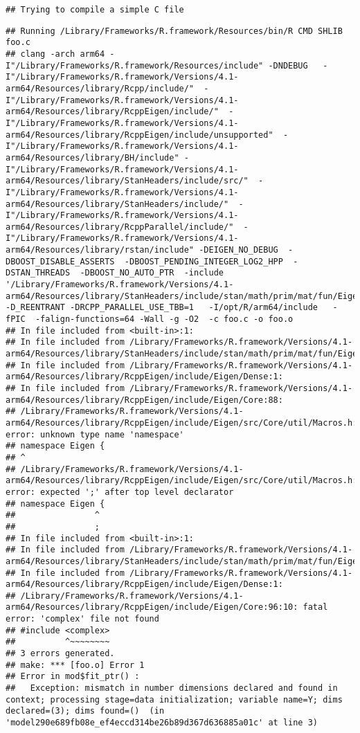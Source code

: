 \documentclass[
]{article}
\begin{document}
\begin{verbatim}
## Trying to compile a simple C file
\end{verbatim}

\begin{verbatim}
## Running /Library/Frameworks/R.framework/Resources/bin/R CMD SHLIB foo.c
## clang -arch arm64 -I"/Library/Frameworks/R.framework/Resources/include" -DNDEBUG   -I"/Library/Frameworks/R.framework/Versions/4.1-arm64/Resources/library/Rcpp/include/"  -I"/Library/Frameworks/R.framework/Versions/4.1-arm64/Resources/library/RcppEigen/include/"  -I"/Library/Frameworks/R.framework/Versions/4.1-arm64/Resources/library/RcppEigen/include/unsupported"  -I"/Library/Frameworks/R.framework/Versions/4.1-arm64/Resources/library/BH/include" -I"/Library/Frameworks/R.framework/Versions/4.1-arm64/Resources/library/StanHeaders/include/src/"  -I"/Library/Frameworks/R.framework/Versions/4.1-arm64/Resources/library/StanHeaders/include/"  -I"/Library/Frameworks/R.framework/Versions/4.1-arm64/Resources/library/RcppParallel/include/"  -I"/Library/Frameworks/R.framework/Versions/4.1-arm64/Resources/library/rstan/include" -DEIGEN_NO_DEBUG  -DBOOST_DISABLE_ASSERTS  -DBOOST_PENDING_INTEGER_LOG2_HPP  -DSTAN_THREADS  -DBOOST_NO_AUTO_PTR  -include '/Library/Frameworks/R.framework/Versions/4.1-arm64/Resources/library/StanHeaders/include/stan/math/prim/mat/fun/Eigen.hpp'  -D_REENTRANT -DRCPP_PARALLEL_USE_TBB=1   -I/opt/R/arm64/include   -fPIC  -falign-functions=64 -Wall -g -O2  -c foo.c -o foo.o
## In file included from <built-in>:1:
## In file included from /Library/Frameworks/R.framework/Versions/4.1-arm64/Resources/library/StanHeaders/include/stan/math/prim/mat/fun/Eigen.hpp:13:
## In file included from /Library/Frameworks/R.framework/Versions/4.1-arm64/Resources/library/RcppEigen/include/Eigen/Dense:1:
## In file included from /Library/Frameworks/R.framework/Versions/4.1-arm64/Resources/library/RcppEigen/include/Eigen/Core:88:
## /Library/Frameworks/R.framework/Versions/4.1-arm64/Resources/library/RcppEigen/include/Eigen/src/Core/util/Macros.h:628:1: error: unknown type name 'namespace'
## namespace Eigen {
## ^
## /Library/Frameworks/R.framework/Versions/4.1-arm64/Resources/library/RcppEigen/include/Eigen/src/Core/util/Macros.h:628:16: error: expected ';' after top level declarator
## namespace Eigen {
##                ^
##                ;
## In file included from <built-in>:1:
## In file included from /Library/Frameworks/R.framework/Versions/4.1-arm64/Resources/library/StanHeaders/include/stan/math/prim/mat/fun/Eigen.hpp:13:
## In file included from /Library/Frameworks/R.framework/Versions/4.1-arm64/Resources/library/RcppEigen/include/Eigen/Dense:1:
## /Library/Frameworks/R.framework/Versions/4.1-arm64/Resources/library/RcppEigen/include/Eigen/Core:96:10: fatal error: 'complex' file not found
## #include <complex>
##          ^~~~~~~~~
## 3 errors generated.
## make: *** [foo.o] Error 1
## Error in mod$fit_ptr() : 
##   Exception: mismatch in number dimensions declared and found in context; processing stage=data initialization; variable name=Y; dims declared=(3); dims found=()  (in 'model290e689fb08e_ef4eccd314be26b89d367d636885a01c' at line 3)
\end{verbatim}
\end{document}
